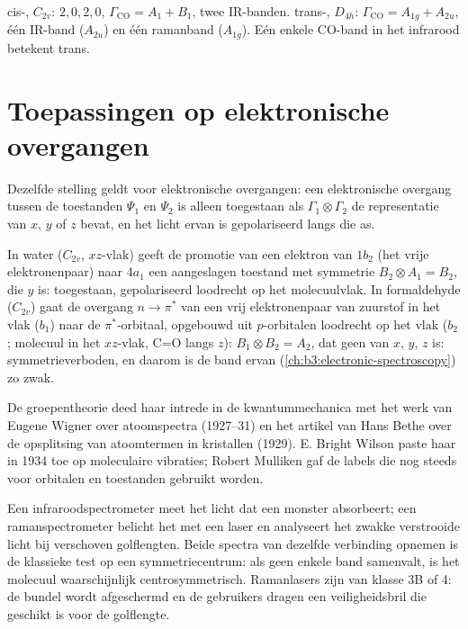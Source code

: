\begin{example}\label{ex:b3:group-theory-applied:cis-trans}
cis-, $C_{2v}$:  $2, 0, 2, 0$, $\Gamma_{\mathrm{CO}} = A_1 + B_1$,
twee IR-banden. trans-, $D_{4h}$: $\Gamma_{\mathrm{CO}} = A_{1g} + A_{2u}$, één
IR-band ($A_{2u}$) en één ramanband ($A_{1g}$). Eén enkele CO-band in het
infrarood betekent trans.
\end{example}

\section{Toepassingen op elektronische overgangen}

Dezelfde stelling geldt voor elektronische overgangen: een elektronische
overgang tussen de toestanden $\Psi_1$ en $\Psi_2$ is alleen toegestaan
als $\Gamma_1\otimes\Gamma_2$
de representatie van $x$, $y$ of $z$ bevat, en het licht ervan is
gepolariseerd langs die as.

\begin{example}\label{ex:b3:group-theory-applied:electronic}
In water ($C_{2v}$, $xz$-vlak) geeft de promotie van een elektron van $1b_2$ (het vrije elektronenpaar)
naar $4a_1$ een aangeslagen toestand met symmetrie $B_2\otimes A_1 = B_2$,
die $y$ is: toegestaan, gepolariseerd loodrecht op het molecuulvlak. In
formaldehyde
($C_{2v}$) gaat de overgang $n\to\pi^*$ van een vrij elektronenpaar van
zuurstof in het vlak ($b_1$)
naar de $\pi^*$-orbitaal, opgebouwd uit $p$-orbitalen loodrecht op het vlak
($b_2$; molecuul in het $xz$-vlak, C=O langs $z$): $B_1\otimes B_2 = A_2$,
dat geen van $x$, $y$, $z$ is: symmetrieverboden, en daarom is de band
ervan (\cref{ch:b3:electronic-spectroscopy}) zo zwak.
\end{example}

\begin{history}
De groepentheorie deed haar intrede in de kwantummechanica met het werk
van Eugene Wigner over atoomspectra (1927--31) en het artikel van Hans
Bethe over de opsplitsing van atoomtermen in kristallen (1929). E. Bright
Wilson paste haar in 1934 toe op moleculaire vibraties; Robert Mulliken
gaf de labels die nog steeds voor orbitalen en toestanden gebruikt worden.
\end{history}

\begin{inthelab}
Een infraroodspectrometer meet het licht dat een monster absorbeert; een
ramanspectrometer belicht het met een laser en analyseert het zwakke
verstrooide licht bij verschoven golflengten. Beide spectra van dezelfde
verbinding opnemen is de klassieke test op een symmetriecentrum: als geen
enkele band samenvalt, is het molecuul waarschijnlijk centrosymmetrisch.
Ramanlasers zijn van klasse 3B of 4: de bundel wordt afgeschermd en de
gebruikers dragen een veiligheidsbril die geschikt is voor de golflengte.
\end{inthelab}

